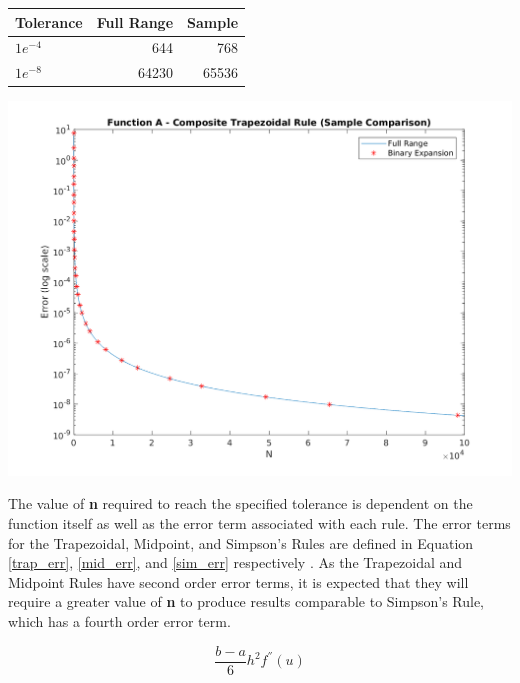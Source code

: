 \documentclass[a4paper]{article}
\begin{document}
\bgroup
\def\arraystretch{1.5}
\begin{center}
	\centering
	\begin{tabular}{l|r|r}
	\textbf{Tolerance} & \textbf{Full Range} & \textbf{Sample} \\
	\hline
	$1e^{-4}$ & 644 & 768\\
	$1e^{-8}$ & 64230 & 65536
	\end{tabular}
	\label{table:sample_comparison}
\end{center}
\egroup

\begin{center}
	\includegraphics[width=1\textwidth]{../output/a_trapezoidal_sample_comparison.png}
	\label{fig:sample_comparison}
\end{center}

The value of \textbf{n} required to reach the specified tolerance is dependent on the function itself as well as the error term associated with each rule. The error terms for the Trapezoidal, Midpoint, and Simpson's Rules are defined in Equation \ref{trap_err}, \ref{mid_err}, and \ref{sim_err} respectively \citep{burden2010}. As the Trapezoidal and Midpoint Rules have second order error terms, it is expected that they will require a greater value of \textbf{n} to produce results comparable to Simpson's Rule, which has a fourth order error term.

\begin{equation}
\frac{b-a}{6}h^2f^{''}(u)
\label{trap_err}
\end{equation}
\end{document}

